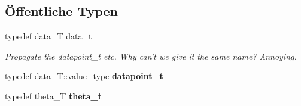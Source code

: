 \subsection*{Öffentliche Typen}
\begin{DoxyCompactItemize}
\item 
\hypertarget{classCDA_1_1FitMulticlassByEM_a05aa6cf01041a71df27a4b8be40298ba}{
typedef data\_\-T \hyperlink{classCDA_1_1FitMulticlassByEM_a05aa6cf01041a71df27a4b8be40298ba}{data\_\-t}}
\label{classCDA_1_1FitMulticlassByEM_a05aa6cf01041a71df27a4b8be40298ba}

\begin{DoxyCompactList}\small\item\em Propagate the datapoint\_\-t etc. Why can't we give it the same name? Annoying. \item\end{DoxyCompactList}\item 
\hypertarget{classCDA_1_1FitMulticlassByEM_a3ddfc994fa8e2960feb82e5e6a4103b2}{
typedef data\_\-T::value\_\-type {\bfseries datapoint\_\-t}}
\label{classCDA_1_1FitMulticlassByEM_a3ddfc994fa8e2960feb82e5e6a4103b2}

\item 
\hypertarget{classCDA_1_1FitMulticlassByEM_afc23366fb0906a43ae74e0b7c9b26db4}{
typedef theta\_\-T {\bfseries theta\_\-t}}
\label{classCDA_1_1FitMulticlassByEM_afc23366fb0906a43ae74e0b7c9b26db4}

\end{DoxyCompactItemize}
